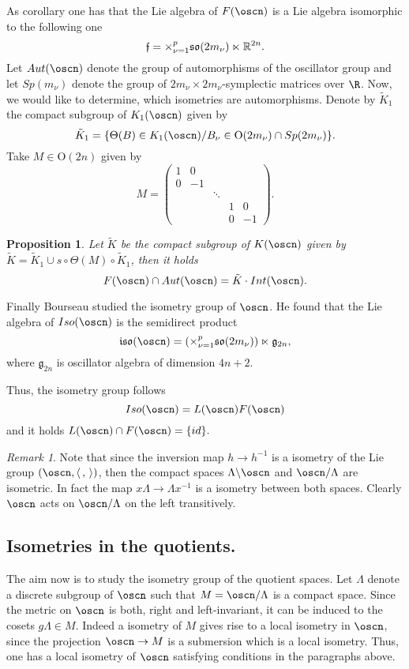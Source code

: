 \documentclass[11pt]{amsart}
\newcommand{\lela}{\left \langle}
\newcommand{\rira}{\right \rangle}
\theoremstyle{plain}
\newtheorem{prop}[thm]{Proposition}
\theoremstyle{definition}
\theoremstyle{remark}
\newtheorem{rem}{Remark}
\begin{document}
   
As corollary one has that the Lie algebra of $F(\oscn)$ is a Lie algebra isomorphic to the following one
$$\mathfrak f ={\Large \times}_{\nu=1}^p \mathfrak{so}(2m_{\nu}) \ltimes \mathbb R^{2n}.$$
    Let $Aut(\oscn)$ denote the group of automorphisms of the oscillator group and let $Sp(m_{\nu})$ denote the group of $2m_{\nu}\times 2m_{\nu}$-symplectic matrices over $\R$. Now, we would like to determine, which isometries are automorphisms. Denote by $\tilde{K}_1$ the compact subgroup of $K_1(\oscn)$ given by 
     $$\tilde{K}_1=\{\Theta(B)\in K_1(\oscn)/B_{\nu}\in \mathrm{O}(2m_{\nu})\cap Sp(2m_{\nu})\}.$$
	Take $M\in \mathrm{O}(2n)$ given by
	$$M=\left( \begin{matrix}
	1 & 0 & & &\\
	0 & -1 & & &\\
	& & \ddots & &\\
	& & & 1 & 0\\
	& & & 0 & -1
	\end{matrix}
	\right).
	$$
	\begin{prop}
		Let $\tilde{K}$ be the compact subgroup of $K(\oscn)$ given by
	$\tilde{K}=\tilde{K}_1 \cup s\circ \Theta(M) \circ \tilde{K}_1$, then it holds
	$$F(\oscn)\cap Aut(\oscn)=\tilde{K}\cdot Int(\oscn).$$
	\end{prop}
Finally Bourseau studied the isometry group of $\oscn$. He found that
the Lie algebra of $Iso(\oscn)$ is the semidirect product
$$\mathfrak{iso}(\oscn)=(\times_{\nu=1}^p \mathfrak{so}(2m_{\nu}))\ltimes \mathfrak g_{2n},$$
where $\mathfrak{g}_{2n}$ is oscillator algebra of dimension $4n+2$. 

Thus, the isometry group follows 
$$Iso(\oscn)=L(\oscn) F(\oscn)$$
 and it holds $L(\oscn)\cap F(\oscn)=\{id\}.$


\begin{rem}
	Note that since the inversion map $h\to h^{-1}$ is a isometry of the Lie group  $(\oscn, \lela\,,\,\rira)$, then the compact spaces $\Lambda \backslash \oscn$ and $\oscn/\Lambda$ are isometric. In fact the map $x\Lambda \to \Lambda x^{-1}$ is a isometry between both spaces. Clearly $\oscn$ acts on $\oscn/\Lambda$ on the left transitively.
\end{rem}

\subsection{Isometries in the quotients. } The aim now is to study the isometry group of the quotient spaces. Let $\Lambda$ denote a discrete subgroup of $\oscn$ such that  $M=\oscn/\Lambda$ is a compact space. Since the metric on $\oscn$ is both, right and left-invariant, it can be induced to the cosets $g\Lambda\in M$. Indeed a isometry of $M$ gives rise to a local isometry in $\oscn$, since the projection $\oscn \to M$ is a submersion which is a local isometry. Thus, one has a local isometry of $\oscn$ satisfying conditions in the paragraphs above. 
\end{document}
